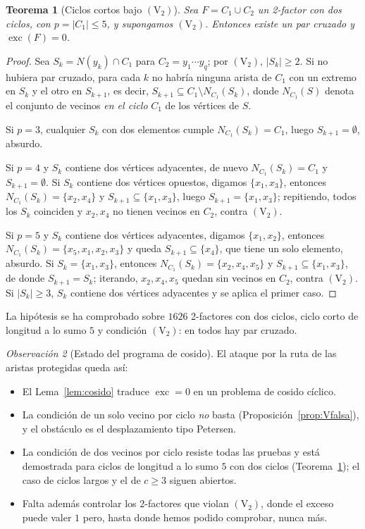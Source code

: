 \documentclass[11pt,a4paper]{article}
\newtheorem{teorema}{Teorema}[section]
\theoremstyle{definition}
\theoremstyle{remark}
\newtheorem{observacion}[teorema]{Observación}
\begin{document}
\begin{teorema}[Ciclos cortos bajo $(\mathrm{V}_2)$]\label{thm:V2corto}
Sea $F=C_1\cup C_2$ un 2-factor con dos ciclos, con $p=|C_1|\le5$, y supongamos $(\mathrm{V}_2)$. Entonces existe un par cruzado y $\operatorname{exc}(F)=0$.
\end{teorema}

\begin{proof}
Sea $S_k=N(y_k)\cap C_1$ para $C_2=y_1\cdots y_q$; por $(\mathrm{V}_2)$, $|S_k|\ge2$. Si no hubiera par cruzado, para cada $k$ no habría ninguna arista de $C_1$ con un extremo en $S_k$ y el otro en $S_{k+1}$, es decir, $S_{k+1}\subseteq C_1\setminus N_{C_1}(S_k)$, donde $N_{C_1}(S)$ denota el conjunto de vecinos \emph{en el ciclo} $C_1$ de los vértices de $S$.

Si $p=3$, cualquier $S_k$ con dos elementos cumple $N_{C_1}(S_k)=C_1$, luego $S_{k+1}=\emptyset$, absurdo.

Si $p=4$ y $S_k$ contiene dos vértices adyacentes, de nuevo $N_{C_1}(S_k)=C_1$ y $S_{k+1}=\emptyset$. Si $S_k$ contiene dos vértices opuestos, digamos $\{x_1,x_3\}$, entonces $N_{C_1}(S_k)=\{x_2,x_4\}$ y $S_{k+1}\subseteq\{x_1,x_3\}$, luego $S_{k+1}=\{x_1,x_3\}$; repitiendo, todos los $S_k$ coinciden y $x_2,x_4$ no tienen vecinos en $C_2$, contra $(\mathrm{V}_2)$.

Si $p=5$ y $S_k$ contiene dos vértices adyacentes, digamos $\{x_1,x_2\}$, entonces $N_{C_1}(S_k)=\{x_5,x_1,x_2,x_3\}$ y queda $S_{k+1}\subseteq\{x_4\}$, que tiene un solo elemento, absurdo. Si $S_k=\{x_1,x_3\}$, entonces $N_{C_1}(S_k)=\{x_2,x_4,x_5\}$ y $S_{k+1}\subseteq\{x_1,x_3\}$, de donde $S_{k+1}=S_k$; iterando, $x_2,x_4,x_5$ quedan sin vecinos en $C_2$, contra $(\mathrm{V}_2)$. Si $|S_k|\ge3$, $S_k$ contiene dos vértices adyacentes y se aplica el primer caso.
\end{proof}

La hipótesis se ha comprobado sobre $1626$ 2-factores con dos ciclos, ciclo corto de longitud a lo sumo $5$ y condición $(\mathrm{V}_2)$: en todos hay par cruzado.

\begin{observacion}[Estado del programa de cosido]\label{obs:programa2}
El ataque por la ruta de las aristas protegidas queda así:
\begin{itemize}
\item El Lema~\ref{lem:cosido} traduce $\operatorname{exc}=0$ en un problema de cosido cíclico.
\item La condición de un solo vecino por ciclo \emph{no} basta (Proposición~\ref{prop:Vfalsa}), y el obstáculo es el desplazamiento tipo Petersen.
\item La condición de dos vecinos por ciclo resiste todas las pruebas y está demostrada para ciclos de longitud a lo sumo $5$ con dos ciclos (Teorema~\ref{thm:V2corto}); el caso de ciclos largos y el de $c\ge3$ siguen abiertos.
\item Falta además controlar los 2-factores que violan $(\mathrm{V}_2)$, donde el exceso puede valer $1$ pero, hasta donde hemos podido comprobar, nunca más.
\end{itemize}
\end{observacion}
\end{document}
